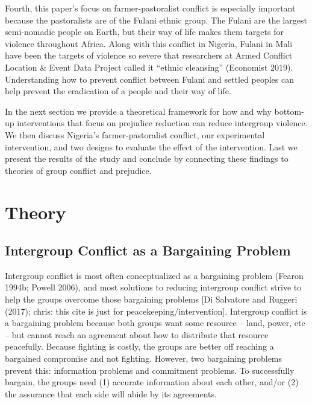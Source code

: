 \documentclass[11pt]{article}
\begin{document}
Fourth, this paper's focus on farmer-pastoralist conflict is especially
important because the pastoralists are of the Fulani ethnic group. The
Fulani are the largest semi-nomadic people on Earth, but their way of
life makes them targets for violence throughout Africa. Along with this
conflict in Nigeria, Fulani in Mali have been the targets of violence so
severe that researchers at Armed Conflict Location \& Event Data Project
called it ``ethnic cleansing'' (Economist 2019). Understanding how to
prevent conflict between Fulani and settled peoples can help prevent the
eradication of a people and their way of life.

In the next section we provide a theoretical framework for how and why
bottom-up interventions that focus on prejudice reduction can reduce
intergroup violence. We then discuss Nigeria's farmer-pastoralist
conflict, our experimental intervention, and two designs to evaluate the
effect of the intervention. Last we present the results of the study and
conclude by connecting these findings to theories of group conflict and
prejudice.

\section{Theory}\label{theory}

\subsection{Intergroup Conflict as a Bargaining
Problem}\label{intergroup-conflict-as-a-bargaining-problem}

Intergroup conflict is most often conceptualized as a bargaining problem
(Fearon 1994b; Powell 2006), and most solutions to reducing intergroup
conflict strive to help the groups overcome those bargaining problems
{[}Di Salvatore and Ruggeri (2017); chris: this cite is just for
peacekeeping/intervention{]}. Intergroup conflict is a bargaining
problem because both groups want some resource -- land, power, etc --
but cannot reach an agreement about how to distribute that resource
peacefully. Because fighting is costly, the groups are better off
reaching a bargained compromise and not fighting. However, two
bargaining problems prevent this: information problems and commitment
problems. To successfully bargain, the groups need (1) accurate
information about each other, and/or (2) the assurance that each side
will abide by its agreements.
\end{document}
